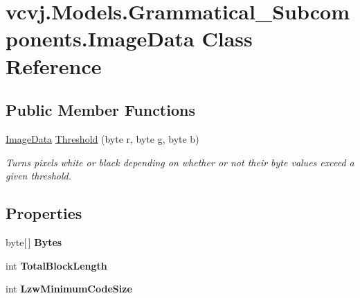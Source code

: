 \hypertarget{classvcvj_1_1_models_1_1_grammatical___subcomponents_1_1_image_data}{}\section{vcvj.\+Models.\+Grammatical\+\_\+\+Subcomponents.\+Image\+Data Class Reference}
\label{classvcvj_1_1_models_1_1_grammatical___subcomponents_1_1_image_data}
\subsection*{Public Member Functions}
\begin{DoxyCompactItemize}
\item 
\hyperlink{classvcvj_1_1_models_1_1_grammatical___subcomponents_1_1_image_data}{Image\+Data} \hyperlink{classvcvj_1_1_models_1_1_grammatical___subcomponents_1_1_image_data_ac0cbc65689a126364a6863199815e0b7}{Threshold} (byte r, byte g, byte b)
\begin{DoxyCompactList}\small\item\em Turns pixels white or black depending on whether or not their byte values exceed a given threshold. \end{DoxyCompactList}\end{DoxyCompactItemize}
\subsection*{Properties}
\begin{DoxyCompactItemize}
\item 
byte\mbox{[}$\,$\mbox{]} {\bfseries Bytes}\hypertarget{classvcvj_1_1_models_1_1_grammatical___subcomponents_1_1_image_data_a4fb8b1e7192b92938932d3d559b1f1c0}{}\label{classvcvj_1_1_models_1_1_grammatical___subcomponents_1_1_image_data_a4fb8b1e7192b92938932d3d559b1f1c0}

\item 
int {\bfseries Total\+Block\+Length}\hypertarget{classvcvj_1_1_models_1_1_grammatical___subcomponents_1_1_image_data_a8ad2052c4d8947c68940e464d2eb983e}{}\label{classvcvj_1_1_models_1_1_grammatical___subcomponents_1_1_image_data_a8ad2052c4d8947c68940e464d2eb983e}

\item 
int {\bfseries Lzw\+Minimum\+Code\+Size}\hypertarget{classvcvj_1_1_models_1_1_grammatical___subcomponents_1_1_image_data_ac7920f89c775125b4a0ed4aa4f9f8366}{}\label{classvcvj_1_1_models_1_1_grammatical___subcomponents_1_1_image_data_ac7920f89c775125b4a0ed4aa4f9f8366}

\end{DoxyCompactItemize}



